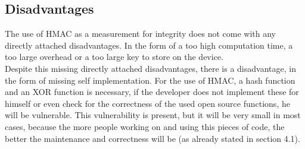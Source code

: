 \subsection{Disadvantages}
The use of HMAC as a measurement for integrity does not come with any directly attached disadvantages. In the form of a too high computation time, a too large overhead or a too large key to store on the device. \\
Despite this missing directly attached disadvantages, there is a disadvantage, in the form of missing self implementation.
For the use of HMAC, a hash function and an XOR function is necessary, if the developer does not implement these for himself or even check for the correctness of the used open source functions, he will be vulnerable. This vulnerability is present, but it will be very small in most cases, because the more people working on and using this pieces of code, the better the maintenance and correctness will be (as already stated in section 4.1). 


